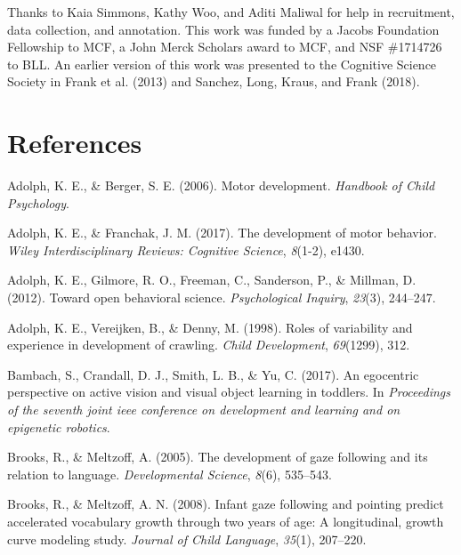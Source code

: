 \documentclass[english,man]{apa6}
\begin{document}
Thanks to Kaia Simmons, Kathy Woo, and Aditi Maliwal for help in
recruitment, data collection, and annotation. This work was funded by a
Jacobs Foundation Fellowship to MCF, a John Merck Scholars award to MCF,
and NSF \#1714726 to BLL. An earlier version of this work was presented
to the Cognitive Science Society in Frank et al. (2013) and Sanchez,
Long, Kraus, and Frank (2018).

\newpage

\section{References}\label{references}

\begingroup
\setlength{\parindent}{-0.5in} \setlength{\leftskip}{0.5in}

\hypertarget{refs}{}
\hypertarget{ref-adolph2006motor}{}
Adolph, K. E., \& Berger, S. E. (2006). Motor development.
\emph{Handbook of Child Psychology}.

\hypertarget{ref-adolph2017development}{}
Adolph, K. E., \& Franchak, J. M. (2017). The development of motor
behavior. \emph{Wiley Interdisciplinary Reviews: Cognitive Science},
\emph{8}(1-2), e1430.

\hypertarget{ref-adolph2012toward}{}
Adolph, K. E., Gilmore, R. O., Freeman, C., Sanderson, P., \& Millman,
D. (2012). Toward open behavioral science. \emph{Psychological Inquiry},
\emph{23}(3), 244--247.

\hypertarget{ref-adolph1998roles}{}
Adolph, K. E., Vereijken, B., \& Denny, M. (1998). Roles of variability
and experience in development of crawling. \emph{Child Development},
\emph{69}(1299), 312.

\hypertarget{ref-bambach2017}{}
Bambach, S., Crandall, D. J., Smith, L. B., \& Yu, C. (2017). An
egocentric perspective on active vision and visual object learning in
toddlers. In \emph{Proceedings of the seventh joint ieee conference on
development and learning and on epigenetic robotics}.

\hypertarget{ref-brooks2005}{}
Brooks, R., \& Meltzoff, A. (2005). The development of gaze following
and its relation to language. \emph{Developmental Science}, \emph{8}(6),
535--543.

\hypertarget{ref-brooks2008}{}
Brooks, R., \& Meltzoff, A. N. (2008). Infant gaze following and
pointing predict accelerated vocabulary growth through two years of age:
A longitudinal, growth curve modeling study. \emph{Journal of Child
Language}, \emph{35}(1), 207--220.
\end{document}
